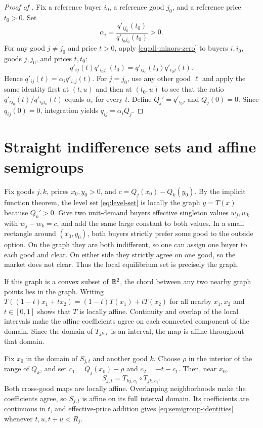 \begin{proof}[Proof of ]
Fix a reference buyer $i_0$, a reference good $j_0$, and a reference price $t_0>0$. Set
\[
\alpha_i=\frac{q'_{ij_0}(t_0)}{q'_{i_0j_0}(t_0)}>0.
\]
For any good $j\ne j_0$ and price $t>0$, apply \eqref{eq:all-minors-zero} to buyers $i,i_0$, goods $j,j_0$, and prices $t,t_0$:
\[
q'_{ij}(t)q'_{i_0j_0}(t_0)
=q'_{ij_0}(t_0)q'_{i_0j}(t).
\]
Hence $q'_{ij}(t)=\alpha_iq'_{i_0j}(t)$. For $j=j_0$, use any other good $\ell$ and apply the same identity first at $(t,u)$ and then at $(t_0,u)$ to see that the ratio $q'_{ij_0}(t)/q'_{i_0j_0}(t)$ equals $\alpha_i$ for every $t$. Define $Q_j'=q'_{i_0j}$ and $Q_j(0)=0$. Since $q_{ij}(0)=0$, integration yields $q_{ij}=\alpha_iQ_j$.
\end{proof}

\section{Straight indifference sets and affine semigroups}\label{app:straight-level}

Fix goods $j,k$, prices $x_0,y_0>0$, and $c=Q_j(x_0)-Q_k(y_0)$. By the implicit function theorem, the level set \eqref{eq:level-set} is locally the graph $y=T(x)$ because $Q_k'>0$. Give two unit-demand buyers effective singleton values $w_j,w_k$ with $w_j-w_k=c$, and add the same large constant to both values. In a small rectangle around $(x_0,y_0)$, both buyers strictly prefer some good to the outside option. On the graph they are both indifferent, so one can assign one buyer to each good and clear. On either side they strictly agree on one good, so the market does not clear. Thus the local equilibrium set is precisely the graph.

If this graph is a convex subset of $\mathbb{R}^2$, the chord between any two nearby graph points lies in the graph. Writing $T((1-t)x_1+tx_2)=(1-t)T(x_1)+tT(x_2)$ for all nearby $x_1,x_2$ and $t\in[0,1]$ shows that $T$ is locally affine. Continuity and overlap of the local intervals make the affine coefficients agree on each connected component of the domain. Since the domain of $T_{jk,c}$ is an interval, the map is affine throughout that domain.

Fix $x_0$ in the domain of $S_{j,t}$ and another good $k$. Choose $\rho$ in the interior of the range of $Q_k$, and set $c_1=Q_j(x_0)-\rho$ and $c_2=-t-c_1$. Then, near $x_0$,
\begin{equation}\label{eq:translation-composition}
S_{j,t}=T_{kj,c_2}\circ T_{jk,c_1}.
\end{equation}
Both cross-good maps are locally affine. Overlapping neighborhoods make the coefficients agree, so $S_{j,t}$ is affine on its full interval domain. Its coefficients are continuous in $t$, and effective-price addition gives \eqref{eq:semigroup-identities} whenever $t,u,t+u<R_j$.

